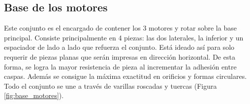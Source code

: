 \begin{figure} [ht!]
  \centering    
  \hspace{1cm}

  \hspace{1cm}
\end{figure}
\newpage
\subsection{Base de los motores}
\noindent Este conjunto es el encargado de contener los 3 motores y rotar sobre la base principal. Consiste principalmente en 4 piezas: las dos laterales, la inferior y un espaciador de lado a lado que refuerza el conjunto. Está ideado así 
para solo requerir de piezas planas que serán impresas en dirección horizontal. De esta forma, se logra la mayor resistencia de pieza al incrementar  
la adhesión entre caspas. Además se consigue la máxima exactitud en orificios y formas circulares. Todo el conjunto se une a través de 
varillas roscadas y tuercas (Figura \ref{fig:base_motores}).

